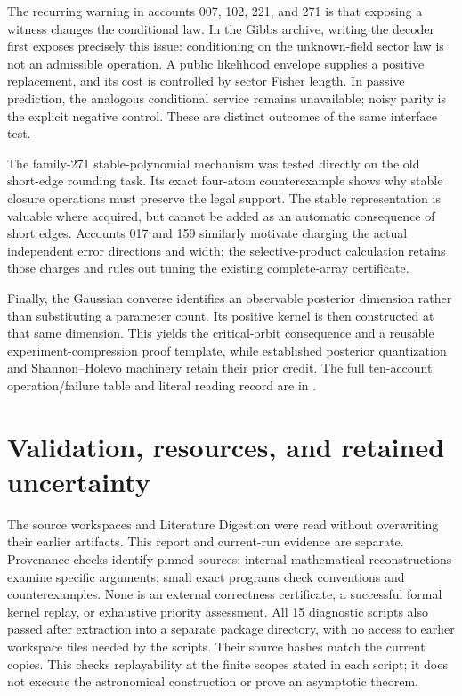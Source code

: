 \documentclass[11pt]{article}
\theoremstyle{definition}
\begin{document}
The recurring warning in accounts 007, 102, 221, and 271 is that
exposing a witness changes the conditional law. In the Gibbs archive,
writing the decoder first exposes precisely this issue: conditioning
on the unknown-field sector law is not an admissible operation.
A public likelihood envelope supplies a positive replacement, and its
cost is controlled by sector Fisher length. In passive prediction,
the analogous conditional service remains unavailable; noisy parity
is the explicit negative control. These are distinct outcomes of the
same interface test.

The family-271 stable-polynomial mechanism was tested directly on
the old short-edge rounding task. Its exact four-atom counterexample
shows why stable closure operations must preserve the legal support.
The stable representation is valuable where acquired, but cannot be
added as an automatic consequence of short edges. Accounts 017 and
159 similarly motivate charging the actual independent error
directions and width; the selective-product calculation retains those
charges and rules out tuning the existing complete-array certificate.

Finally, the Gaussian converse identifies an observable posterior
dimension rather than substituting a parameter count. Its positive
kernel is then constructed at that same dimension. This yields the
critical-orbit consequence and a reusable experiment-compression
proof template, while established posterior quantization and
Shannon--Holevo machinery retain their prior credit.
The full ten-account operation/failure table and literal reading
record are in .

\section{Validation, resources, and retained uncertainty}
The source workspaces and Literature Digestion were read without
overwriting their earlier artifacts. This report and current-run
evidence are separate. Provenance checks identify pinned sources;
internal mathematical reconstructions examine specific arguments;
small exact programs check conventions and counterexamples.
None is an external correctness certificate, a successful formal
kernel replay, or exhaustive priority assessment.
All 15 diagnostic scripts also passed after extraction into a separate
package directory, with no access to earlier workspace files needed by
the scripts. Their source hashes match the current copies. This checks
replayability at the finite scopes stated in each script; it does not
execute the astronomical construction or prove an asymptotic theorem.
\end{document}
